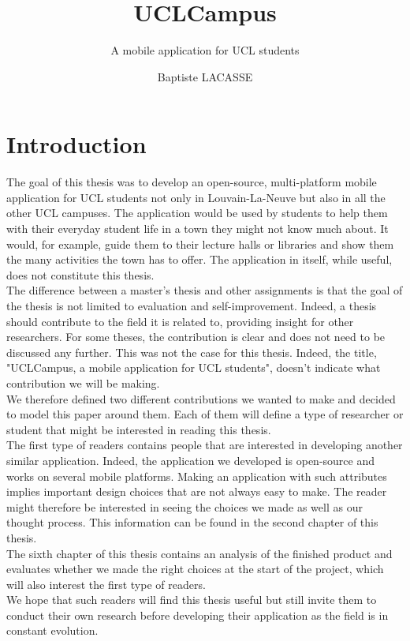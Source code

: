\documentclass{eplmastersthesis}
\title{UCLCampus}	%
\subtitle{A mobile application for UCL students}			%
\author{Baptiste \textsc{LACASSE}}	%
\begin{document}
\maketitle					%
\thispagestyle{empty}		%
\tableofcontents %
\newpage %
\linespread{1.2} %

\chapter{Introduction} %

The goal of this thesis was to develop an open-source, multi-platform mobile application for UCL students not only in Louvain-La-Neuve but also in all the  other UCL campuses. The application would be used by students to help them with their everyday student life in a town they might not know much about. It would, for example, guide them to their lecture halls or libraries and show them the many activities the town has to offer. The application in itself, while useful, does not constitute this thesis.\\

The difference between a master's thesis and other assignments is that the goal of the thesis is not limited to evaluation and self-improvement. Indeed, a thesis should contribute to the field it is related to, providing insight for other researchers. For some theses, the contribution is clear and does not need to be discussed any further. This was not the case for this thesis. Indeed, the title, "UCLCampus, a mobile application for UCL students", doesn't indicate what contribution we will be making.\\

 We therefore defined two different contributions we wanted to make and decided to model this paper around them. Each of them will define a type of researcher or student that might be interested in reading this thesis.\\

The first type of readers contains people that are interested in developing another similar application. Indeed, the application we developed is open-source and works on several mobile platforms. Making an application with such attributes implies important design choices that are not always easy to make. The reader might therefore be interested in seeing the choices we made as well as our thought process. This information can be found in the second chapter of this thesis.\\
The sixth chapter of this thesis contains an analysis of the finished product and evaluates whether we made the right choices at the start of the project, which will also interest the first type of readers.\\
We hope that such readers will find this thesis useful but still invite them to conduct their own research before developing their application as the field is in constant evolution.\\
\end{document}
